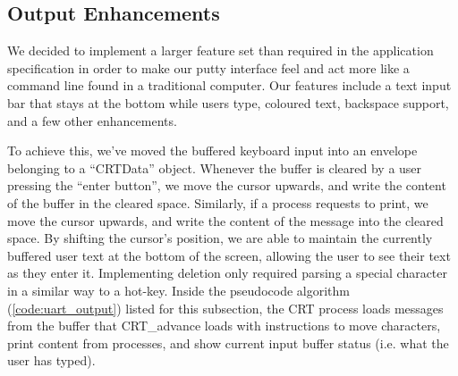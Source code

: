 \documentclass[12pt]{report}
\begin{document}

\subsection{Output Enhancements}
\label{sec:outputEnhancements}
    We decided to implement a larger feature set than required in the
    application specification in order to make our putty interface feel and act
    more like a command line found in a traditional computer. Our features
    include a text input bar that stays at the bottom while users type, coloured
    text, backspace support, and a few other enhancements.

    To achieve this, we've moved the buffered keyboard input into an envelope
    belonging to a ``CRTData'' object. Whenever the buffer is cleared by a
    user pressing the ``enter button'', we move the cursor upwards, and write
    the content of the buffer in the cleared space. Similarly, if a process
    requests to print, we move the cursor upwards, and write the content of the
    message into the cleared space. By shifting the cursor's position, we are
    able to maintain the currently buffered user text at the bottom of the
    screen, allowing the user to see their text as they enter it. Implementing
    deletion only required parsing a special character in a similar way to a
    hot-key. Inside the pseudocode algorithm (\ref{code:uart_output}) listed for
    this subsection, the CRT process loads messages from the buffer that
    CRT\_advance loads with instructions to move characters, print content from
    processes, and show current input buffer status (i.e. what the user has
    typed).
\end{document}
